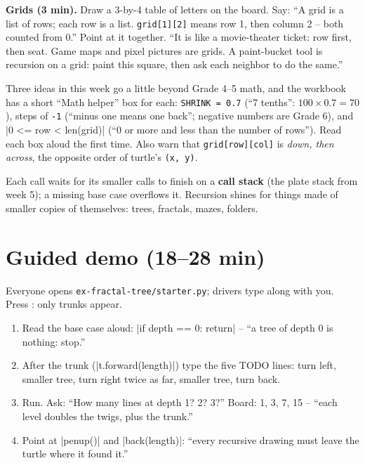 \textbf{Grids (3 min).} Draw a 3-by-4 table of letters on the board. Say: \enquote{A grid is a list of rows; each row is a list. \texttt{grid[1][2]} means row 1, then column 2 -- both counted from 0.} Point at it together. \enquote{It is like a movie-theater ticket: row first, then seat. Game maps and pixel pictures are grids. A paint-bucket tool is recursion on a grid: paint this square, then ask each neighbor to do the same.}

\begin{teachernote}
Three ideas in this week go a little beyond Grade 4--5 math, and the workbook has a short \enquote{Math helper} box for each: \texttt{SHRINK = 0.7} (\enquote{7 tenths}: $100 \times 0.7 = 70$), steps of \texttt{-1} (\enquote{minus one means one back}; negative numbers are Grade 6), and \py|0 <= row < len(grid)| (\enquote{0 or more and less than the number of rows}). Read each box aloud the first time. Also warn that \texttt{grid[row][col]} is \emph{down, then across}, the opposite order of turtle's \texttt{(x, y)}.
\end{teachernote}

\begin{teachernote}
Each call waits for its smaller calls to finish on a \textbf{call stack} (the plate stack from week 5); a missing base case overflows it. Recursion shines for things made of smaller copies of themselves: trees, fractals, mazes, folders.
\end{teachernote}

\section{Guided demo (18--28 min)}
\begin{workedexample}
Everyone opens \texttt{ex-fractal-tree/starter.py}; drivers type along with you. Press : only trunks appear.
\begin{enumerate}[itemsep=1pt]
  \item Read the base case aloud: \py|if depth == 0: return| -- \enquote{a tree of depth 0 is nothing: stop.}
  \item After the trunk (\py|t.forward(length)|) type the five TODO lines: turn left, smaller tree, turn right twice as far, smaller tree, turn back.
  \item Run. Ask: \enquote{How many lines at depth 1? 2? 3?} Board: 1, 3, 7, 15 -- \enquote{each level doubles the twigs, plus the trunk.}
  \item Point at \py|penup()| and \py|back(length)|: \enquote{every recursive drawing must leave the turtle where it found it.}
\end{enumerate}
\end{workedexample}

